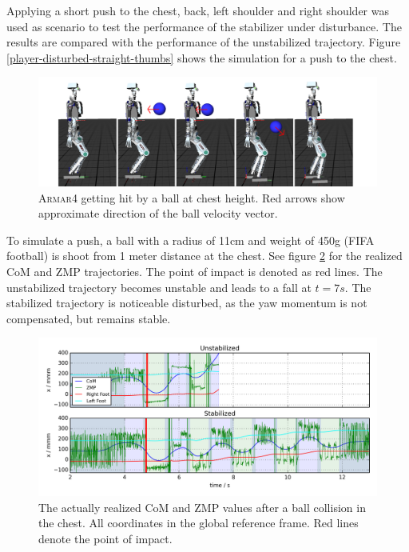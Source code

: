 \documentclass[english,ngerman]{KITreprt}
\newcommand{\name}[1]{\textsc{#1}}
\begin{document}
Applying a short push to the chest, back, left shoulder and right
shoulder was used as scenario to test the performance of the stabilizer
under disturbance. The results are compared with the performance of the
unstabilized trajectory. Figure \ref{player-disturbed-straight-thumbs}
shows the simulation for a push to the chest.

\begin{figure}[H]
\vspace*{-1em}
\includegraphics[width=\textwidth,resolution=300]{images/disturbed_straight_thumbs.png}
\caption{\name{Armar4} getting hit by a ball at chest height. Red arrows show approximate direction of the ball velocity vector. \cite{niklaus2014videostabilizedpush}}
\label{img:player-disturbed-straight-thumbs}
\end{figure}

To simulate a push, a ball with a radius of 11cm and weight of 450g
(FIFA football) is shoot from 1 meter distance at the chest. See figure
\ref{img:disturbed-front-straight-x} for the realized CoM and ZMP
trajectories. The point of impact is denoted as red lines. The
unstabilized trajectory becomes unstable and leads to a fall at
$t = 7s$. The stabilized trajectory is noticeable disturbed, as the yaw
momentum is not compensated, but remains stable.

\begin{figure}[hbt]
\vspace*{-1em}
\includegraphics[width=\textwidth,resolution=300]{images/disturbed_front_straight_x.png}
\caption{The actually realized CoM and ZMP values after a ball collision in the chest.
All coordinates in the global reference frame. Red lines denote the point of impact.}
\label{img:disturbed-front-straight-x}
\end{figure}
\end{document}
